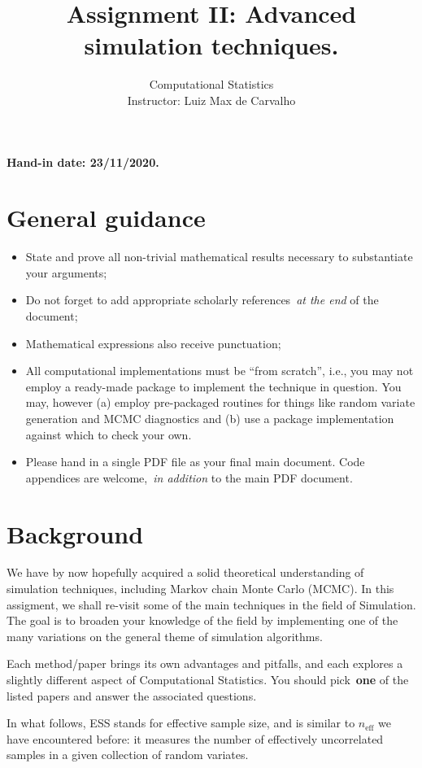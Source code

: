 \documentclass[a4paper,10pt, notitlepage]{report}
\title{Assignment II: Advanced simulation techniques.}
\author{Computational Statistics \\ Instructor: Luiz Max de Carvalho}
\begin{document}
\maketitle

\textbf{Hand-in date: 23/11/2020.}

\section*{General guidance}
\begin{itemize}
 \item State and prove all non-trivial mathematical results necessary to substantiate your arguments;
 \item Do not forget to add appropriate scholarly references~\textit{at the end} of the document;
 \item Mathematical expressions also receive punctuation;
 \item All computational implementations must be ``from scratch'', i.e., you may not employ a ready-made package to implement the technique in question. 
 You may, however (a) employ pre-packaged routines for things like random variate generation and MCMC diagnostics and (b) use a package implementation against which to check your own.
 \item Please hand in a single PDF file as your final main document.
 Code appendices are welcome,~\textit{in addition} to the main PDF document.
 \end{itemize}


\section*{Background}

We have by now hopefully acquired a solid theoretical understanding of simulation techniques, including Markov chain Monte Carlo (MCMC).
In this assigment, we shall re-visit some of the main techniques in the field of Simulation.
The goal is to broaden your knowledge of the field by implementing one of the many variations on the general theme of simulation algorithms.

Each method/paper brings its own advantages and pitfalls, and each explores a slightly different aspect of Computational Statistics.
You should pick~\textbf{one} of the listed papers and answer the associated questions.

In what follows, ESS stands for effective sample size, and is similar to $n_{\text{eff}}$ we have encountered before: it measures the number of effectively uncorrelated samples in a given collection of random variates.
\end{document}

